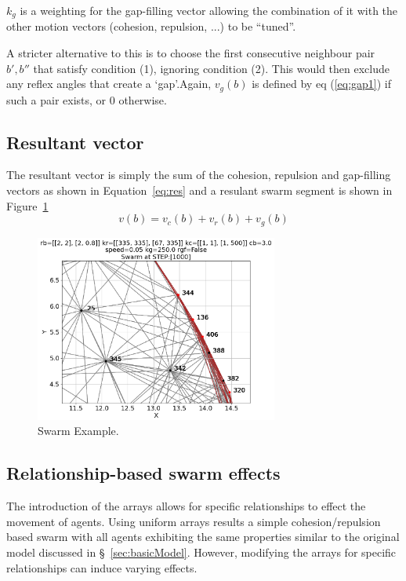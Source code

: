 \documentclass[12pt,a4paper]{IEEEtran}
\newcommand{\kg}{\mathit{k_g}}
\begin{document}
$\kg$ is a weighting for the gap-filling vector allowing the combination of it
with the other motion vectors (cohesion, repulsion, ...) to be ``tuned''.

A stricter alternative to this is to choose the first consecutive neighbour
pair $b',b''$ that satisfy condition (1), ignoring condition (2).  This would then exclude any reflex angles that create a `gap'.Again, $v_g(b)$ is defined by eq (\ref{eq:gap1}) if such a pair exists, or 0 otherwise.

\subsection{Resultant vector}
The resultant vector is simply the sum of the cohesion, repulsion and
gap-filling vectors as shown in Equation~\ref{eq:res} and a resulant swarm segment is shown in Figure~\ref{fig:swarmExample}
\begin{equation}\label{eq:res}
	v(b) = v_c(b) + v_r(b) + v_g(b) 
\end{equation}

\begin{figure}[H]
	\begin{center}
		\includegraphics[width=8cm]{figures/perimeterCompress}
	\end{center}
	\caption{Swarm Example.\label{fig:swarmExample}}
\end{figure}

\subsection{Relationship-based swarm effects}

The introduction of the arrays allows for specific relationships to effect the movement of agents. Using uniform arrays results a simple cohesion/repulsion based swarm with all agents exhibiting the same properties similar to the original model discussed in \S~\ref{sec:basicModel}. However, modifying the arrays for specific relationships can induce varying effects.
\end{document}
